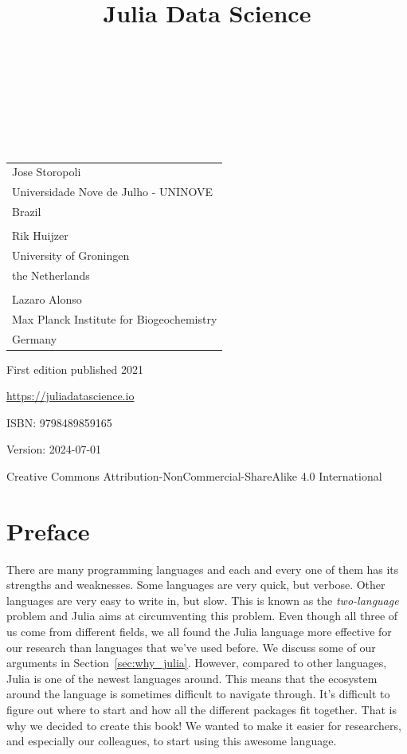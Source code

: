 \documentclass[
  notoc %
]{tufte-book}
\title{Julia Data Science}
\author{\noindent{Jose Storopoli}\\[3mm] \noindent{Rik
Huijzer}\\[3mm] \noindent{Lazaro Alonso}\\[3mm] }
\date{}
\begin{document}
\makeatletter
\thispagestyle{empty}
\vfill
{\Huge\bf
\noindent
\@title
}\\[1in]
{\Large
\noindent
\@author
}
\makeatother

\makeatletter
\newpage
\thispagestyle{empty}
\vfill
{\noindent
\begin{tabular}{l} Jose Storopoli\\ Universidade Nove de Julho - UNINOVE\\ Brazil\\ \\ Rik Huijzer\\ University of Groningen\\ the Netherlands\\ \\ Lazaro Alonso\\ Max Planck Institute for Biogeochemistry\\ Germany \end{tabular}
}
\vfill
{\small
First edition published 2021

\url{https://juliadatascience.io}

ISBN: 9798489859165

Version: 2024-07-01

Creative Commons Attribution-NonCommercial-ShareAlike 4.0 International
}
\makeatother


\frontmatter
\mainmatter

\setcounter{tocdepth}{1}
\tableofcontents

\justifying

\setlength{\parindent}{0pt}

\hypertarget{sec:preface}{%
\chapter{Preface}\label{sec:preface}}

There are many programming languages and each and every one of them has
its strengths and weaknesses. Some languages are very quick, but
verbose. Other languages are very easy to write in, but slow. This is
known as the \emph{two-language} problem and Julia aims at circumventing
this problem. Even though all three of us come from different fields, we
all found the Julia language more effective for our research than
languages that we've used before. We discuss some of our arguments in
Section~\ref{sec:why_julia}. However, compared to other languages, Julia
is one of the newest languages around. This means that the ecosystem
around the language is sometimes difficult to navigate through. It's
difficult to figure out where to start and how all the different
packages fit together. That is why we decided to create this book! We
wanted to make it easier for researchers, and especially our colleagues,
to start using this awesome language.
\end{document}
